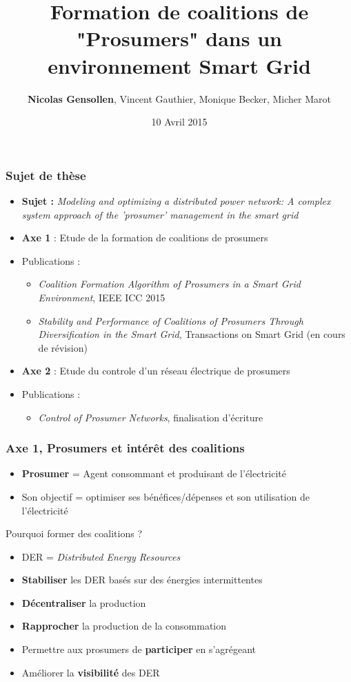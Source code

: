 \documentclass[xcolor=dvipsnames]{beamer}
\title{Formation de coalitions de "Prosumers" dans un environnement Smart Grid}
\author[N. Gensollen]{\textbf{Nicolas Gensollen}, Vincent Gauthier, Monique Becker, Micher Marot}
\institute[TSP]{
  CNRS SAMOVAR, Telecom SudParis\\
  Institut Mines\-Telecom\\[1ex]
  \texttt{nicolas.gensollen@telecom-sudparis.eu}
}
\date{10 Avril 2015}
\begin{document}
%
%
\begin{frame}
	\frametitle{Sujet de thèse}

\begin{itemize}
	\item \textbf{Sujet :} \textit{Modeling and optimizing a distributed power network: A complex system approach of the 'prosumer' management in the smart grid}
	\item \textbf{Axe 1} : Etude de la formation de coalitions de prosumers
	\item Publications :
	\begin{itemize}
		\item \textit{Coalition Formation Algorithm of Prosumers in a Smart Grid Environment}, IEEE ICC 2015
		\item \textit{Stability and Performance of Coalitions of Prosumers Through Diversification in the Smart Grid}, Transactions on Smart Grid (en cours de révision)
	\end{itemize}
	\item \textbf{Axe 2} : Etude du controle d'un réseau électrique de prosumers
	\item Publications :
	\begin{itemize}
		\item \textit{Control of Prosumer Networks}, finalisation d'écriture
	\end{itemize}
\end{itemize}

\end{frame}


%
%
\begin{frame}
	\frametitle{Axe 1, Prosumers et intérêt des coalitions}


\begin{itemize}
	\item \textbf{Prosumer} = Agent consommant et produisant de l'électricité
	\item Son objectif = optimiser ses bénéfices/dépenses et son utilisation de l'électricité
\end{itemize}
Pourquoi former des coalitions ?
\begin{itemize}
	\item DER = \textit{Distributed Energy Resources}	
	\item \textbf{Stabiliser} les DER basés sur des énergies intermittentes 
	\item \textbf{Décentraliser} la production
	\item \textbf{Rapprocher} la production de la consommation
	\item Permettre aux prosumers de \textbf{participer} en s'agrégeant
	\item Améliorer la \textbf{visibilité} des DER
\end{itemize}

\end{frame}
\end{document}
